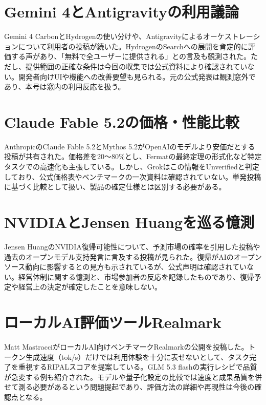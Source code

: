 \section{Gemini 4とAntigravityの利用議論}
Gemini 4 CarbonとHydrogenの使い分けや、Antigravityによるオーケストレーションについて利用者の投稿が続いた。HydrogenのSearchへの展開を肯定的に評価する声があり、「無料で全ユーザーに提供される」との言及も観測された。ただし、提供範囲の正確な条件は今回の収集では公式資料により確認されていない。開発者向けUIや機能への改善要望も見られる。元の公式発表は観測窓外であり、本号は窓内の利用反応を扱う。

\section{Claude Fable 5.2の価格・性能比較}
AnthropicのClaude Fable 5.2とMythos 5.2がOpenAIのモデルより安価だとする投稿が共有された。価格差を20～80\%とし、Fermatの最終定理の形式化など特定タスクでの高速化も主張している。しかし、Grokはこの情報をUnverifiedと判定しており、公式価格表やベンチマークの一次資料は確認されていない。単発投稿に基づく比較として扱い、製品の確定仕様とは区別する必要がある。

\section{NVIDIAとJensen Huangを巡る憶測}
Jensen HuangのNVIDIA復帰可能性について、予測市場の確率を引用した投稿や過去のオープンモデル支持発言に言及する投稿が見られた。復帰がAIのオープンソース動向に影響するとの見方も示されているが、公式声明は確認されていない。経営体制に関する憶測と、市場参加者の反応を記録したものであり、復帰予定や経営上の決定が確定したことを意味しない。

\section{ローカルAI評価ツールRealmark}
Matt MastracciがローカルAI向けベンチマークRealmarkの公開を投稿した。トークン生成速度（tok/s）だけでは利用体験を十分に表せないとして、タスク完了を重視するRIPALスコアを提案している。GLM 5.3 flashの実行レシピで品質が急変する例も紹介された。モデルや量子化設定の比較では速度と成果品質を併せて測る必要があるという問題提起であり、評価方法の詳細や再現性は今後の確認点となる。

